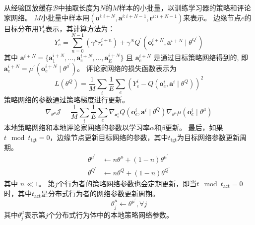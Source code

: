 从经验回放缓存$\mathcal{B}$中抽取长度为$N$的$M$样本的小批量，以训练学习器的策略和评论家网络。
$M$小批量中样本用$\left(\boldsymbol{o}^{i:i+N}, \boldsymbol{a}^{i:i+N-1}, \boldsymbol{r}^{i:i+N-1}\right)$来表示。
边缘节点$e$的目标分布用$Y_e^i$表示，其计算方法为：
\begin{equation}
	Y_e^{i} = \sum_{n=0}^{N-1} \left( \gamma^{n} r_{e}^{i+n}\right)+\gamma^{N} Q^{\prime}\left(\boldsymbol{o}_{e}^{i+N}, \boldsymbol{a}^{i+N} \mid \theta^{Q^{\prime}} \right)
\end{equation}
\noindent 其中 $\boldsymbol{a}^{i+N} = \{ \boldsymbol{a}_{1}^{i+N}, \ldots, \boldsymbol{a}_{e}^{i+N}, \ldots, \boldsymbol{a}_{E}^{i+N} \}$ 且 $\boldsymbol{a}_{e}^{i+N}$ 是通过目标策略网络得到的, 即$\boldsymbol{a}_{e}^{i+N} = \mu^{\prime}(\boldsymbol{o}_{e}^{i+N} \mid \theta^{\mu^{\prime}})$。
评论家网络的损失函数表示为
\begin{equation}
	{L}\left(\theta^{Q}\right)=\frac{1}{M} \sum_{i} \frac{1}{E} \sum_{e} \left(Y_e^{i}-Q\left(\boldsymbol{o}_{e}^{i}, \boldsymbol{a}^{i} \mid \theta^{Q}\right)\right)^{2}
\end{equation}
策略网络的参数通过策略梯度进行更新。
\begin{equation}
	\nabla_{\theta^{\mu}} \mathcal{J} = \frac{1}{M} \sum_{i} \frac{1}{E} \sum_{e} \nabla_{\boldsymbol{a}_{e}^{i}} Q\left(\boldsymbol{o}_{e}^{i}, \boldsymbol{a}^{i} \mid \theta^{Q}\right) \nabla_{\theta^{\mu}} \mu\left(\boldsymbol{o}_{e}^{i} \mid \theta^{\mu}\right)
\end{equation}
本地策略网络和本地评论家网络的参数以学习率$\alpha$和$\beta$更新。
最后，如果$t\mod t_{\operatorname{tgt}}=0$，边缘节点更新目标网络的参数，其中$t_{\operatorname{tgt}}$为目标网络参数更新周期。
\begin{align}
	\theta^{\mu^{\prime}} &\leftarrow n \theta^{\mu}+(1-n)  \theta^{\mu^{\prime}}\\
	\theta^{Q^{\prime}} &\leftarrow n  \theta^{Q}+(1-n) \theta^{Q^{\prime}}
\end{align}
\noindent 其中 $n \ll 1$。
第$j$个行为者的策略网络参数也会定期更新，即当$t \mod t_{\operatorname{act}} = 0$时，其中$t_{\operatorname{act}}$是分布式行为者的网络参数更新周期。
\begin{equation}
	\theta_{j}^{\mu} \leftarrow \theta^{\mu^{\prime}}, \forall j
\end{equation}
其中$\theta_{j}^{\mu}$表示第$j$个分布式行为体中的本地策略网络参数。
	
